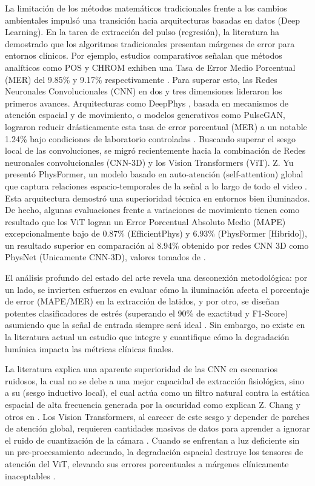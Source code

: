 La limitación de los métodos matemáticos tradicionales frente a los cambios ambientales impulsó una transición hacia arquitecturas basadas en datos (Deep Learning). 
En la tarea de extracción del pulso (regresión), la literatura ha demostrado que los algoritmos tradicionales presentan márgenes de error para 
entornos clínicos. Por ejemplo, estudios comparativos señalan que métodos analíticos como POS y CHROM exhiben una Tasa de Error Medio Porcentual (MER) del 9.85\% 
y 9.17\% respectivamente \cite{ma2025rfbayes}. Para superar esto, las Redes Neuronales Convolucionales (CNN) en dos y tres dimensiones lideraron los primeros avances. Arquitecturas 
como DeepPhys \cite{chen2024image_en}, basada en mecanismos de atención espacial y de movimiento, o modelos generativos como PulseGAN, lograron reducir drásticamente esta tasa de error 
porcentual (MER) a un notable 1.24\% bajo condiciones de laboratorio controladas \cite{ma2025rfbayes}.
Buscando superar el sesgo local de las convoluciones, se migró recientemente hacia la combinación de Redes neuronales convolucionales (CNN-3D) y los Vision Transformers (ViT). Z. Yu presentó PhysFormer, 
un modelo basado en auto-atención (self-attention) global que captura relaciones espacio-temporales de la señal a lo largo de todo el video \cite{yu2023physformer, yue2024facial_peak}. Esta arquitectura 
demostró una superioridad técnica en entornos bien iluminados. De hecho, algunas evaluaciones frente a variaciones de 
movimiento tienen como resultado que los ViT logran un Error Porcentual Absoluto Medio (MAPE) excepcionalmente bajo de 0.87\% (EfficientPhys) y 6.93\% (PhysFormer [Hibrido]), un resultado superior en comparación al 8.94\% 
obtenido por redes CNN 3D como PhysNet (Unicamente CNN-3D), valores tomados de \cite{dehnad2024factorize}.

El análisis profundo del estado del arte revela una desconexión metodológica: por un lado, se invierten esfuerzos en evaluar cómo la iluminación afecta el 
porcentaje de error (MAPE/MER) en la extracción de latidos, y por otro, se diseñan potentes clasificadores de estrés 
(superando el 90\% de exactitud y F1-Score) asumiendo que la señal de entrada siempre será ideal \cite{fontes2024enhancing}.
Sin embargo, no existe en la literatura actual un estudio que integre y cuantifique cómo la degradación lumínica impacta las métricas clínicas finales. 

La literatura explica una aparente superioridad de las CNN en escenarios ruidosos, la cual no se debe a una mejor capacidad de extracción fisiológica, sino a su 
(sesgo inductivo local), el cual actúa como un filtro natural contra la estática espacial de alta frecuencia generada por la oscuridad como explican Z. Chang y otros en \cite{chang2025physvim}. Los Vision Transformers, 
al carecer de este sesgo y depender de parches de atención global, requieren cantidades masivas de datos para aprender a ignorar el ruido de cuantización de la 
cámara \cite{chang2025physvim}. Cuando se enfrentan a luz deficiente sin un pre-procesamiento adecuado, la degradación espacial destruye los tensores de atención del ViT, elevando sus 
errores porcentuales a márgenes clínicamente inaceptables \cite{chang2025physvim}.\\

